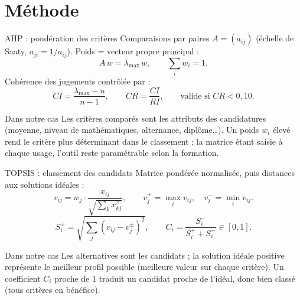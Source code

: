 \section{Méthode}

\begin{frame}{AHP : pondération des critères}
  Comparaisons par paires $A=(a_{ij})$ (échelle de Saaty, $a_{ji}=1/a_{ij}$).
  Poids = \alert{vecteur propre principal} :
  \[
    A\,w = \lambda_{\max}\,w, \qquad \textstyle\sum_i w_i = 1.
  \]
  Cohérence des jugements contrôlée par :
  \[
    CI = \frac{\lambda_{\max}-n}{n-1}, \qquad CR = \frac{CI}{RI}, \qquad
    \text{valide si } CR < 0{,}10 .
  \]
  \begin{block}{Dans notre cas}\small
    Les critères comparés sont les attributs des candidatures (moyenne, niveau de
    mathématiques, alternance, diplôme\ldots). Un poids $w_i$ élevé rend le critère plus
    déterminant dans le classement ; la matrice étant saisie à chaque usage, l'outil reste
    \alert{paramétrable} selon la formation.
  \end{block}
\end{frame}

\begin{frame}{TOPSIS : classement des candidats}
  Matrice pondérée normalisée, puis distances aux solutions idéales :
  \[
    v_{ij} = w_j \cdot \frac{x_{ij}}{\sqrt{\sum_k x_{kj}^2}}, \qquad
    v_j^{+}=\max_i v_{ij}, \quad v_j^{-}=\min_i v_{ij}.
  \]
  \[
    S_i^{\pm} = \sqrt{\textstyle\sum_j (v_{ij}-v_j^{\pm})^2}, \qquad
    C_i = \frac{S_i^{-}}{S_i^{+}+S_i^{-}} \in [0,1].
  \]
  \begin{block}{Dans notre cas}\small
    Les alternatives sont les \alert{candidats} ; la solution idéale positive représente le
    meilleur profil possible (meilleure valeur sur chaque critère). Un coefficient $C_i$ proche
    de $1$ traduit un candidat proche de l'idéal, donc \alert{bien classé} (tous critères en
    bénéfice).
  \end{block}
\end{frame}

